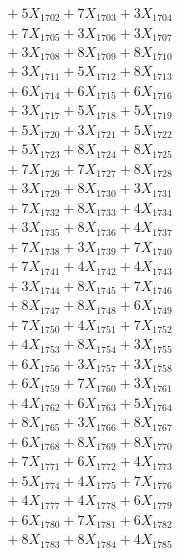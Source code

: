 \documentclass[a4paper,10pt]{article}
\begin{document}
{\begin{align}
&\;  + 5 X_{1702} + 7 X_{1703} + 3 X_{1704} \\[0.3ex]
&\;  + 7 X_{1705} + 3 X_{1706} + 3 X_{1707} \\[0.3ex]
&\;  + 3 X_{1708} + 8 X_{1709} + 8 X_{1710} \\[0.3ex]
&\;  + 3 X_{1711} + 5 X_{1712} + 8 X_{1713} \\[0.3ex]
&\;  + 6 X_{1714} + 6 X_{1715} + 6 X_{1716} \\[0.3ex]
&\;  + 3 X_{1717} + 5 X_{1718} + 5 X_{1719} \\[0.5ex]\allowbreak
&\;  + 5 X_{1720} + 3 X_{1721} + 5 X_{1722} \\[0.3ex]
&\;  + 5 X_{1723} + 8 X_{1724} + 8 X_{1725} \\[0.3ex]
&\;  + 7 X_{1726} + 7 X_{1727} + 8 X_{1728} \\[0.3ex]
&\;  + 3 X_{1729} + 8 X_{1730} + 3 X_{1731} \\[0.3ex]
&\;  + 7 X_{1732} + 8 X_{1733} + 4 X_{1734} \\[0.3ex]
&\;  + 3 X_{1735} + 8 X_{1736} + 4 X_{1737} \\[0.3ex]
&\;  + 7 X_{1738} + 3 X_{1739} + 7 X_{1740} \\[0.3ex]
&\;  + 7 X_{1741} + 4 X_{1742} + 4 X_{1743} \\[0.3ex]
&\;  + 3 X_{1744} + 8 X_{1745} + 7 X_{1746} \\[0.3ex]
&\;  + 8 X_{1747} + 8 X_{1748} + 6 X_{1749} \\[0.5ex]\allowbreak
&\;  + 7 X_{1750} + 4 X_{1751} + 7 X_{1752} \\[0.3ex]
&\;  + 4 X_{1753} + 8 X_{1754} + 3 X_{1755} \\[0.3ex]
&\;  + 6 X_{1756} + 3 X_{1757} + 3 X_{1758} \\[0.3ex]
&\;  + 6 X_{1759} + 7 X_{1760} + 3 X_{1761} \\[0.3ex]
&\;  + 4 X_{1762} + 6 X_{1763} + 5 X_{1764} \\[0.3ex]
&\;  + 8 X_{1765} + 3 X_{1766} + 8 X_{1767} \\[0.3ex]
&\;  + 6 X_{1768} + 8 X_{1769} + 8 X_{1770} \\[0.3ex]
&\;  + 7 X_{1771} + 6 X_{1772} + 4 X_{1773} \\[0.3ex]
&\;  + 5 X_{1774} + 4 X_{1775} + 7 X_{1776} \\[0.3ex]
&\;  + 4 X_{1777} + 4 X_{1778} + 6 X_{1779} \\[0.5ex]\allowbreak
&\;  + 6 X_{1780} + 7 X_{1781} + 6 X_{1782} \\[0.3ex]
&\;  + 8 X_{1783} + 8 X_{1784} + 4 X_{1785} \\[0.3ex]

\end{align}}
\end{document}
